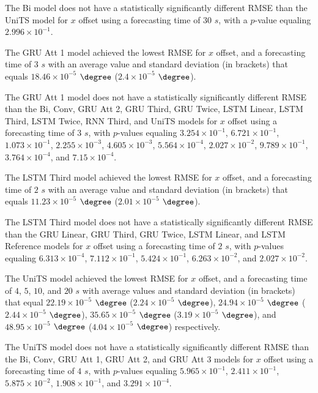 The Bi model does not have a statistically significantly different RMSE than the UniTS model for $x$ offset using a forecasting time of $30$ $s$, with a $p$-value equaling $2.996 \times 10^{-1}$.

The GRU Att 1 model achieved the lowest RMSE for $x$ offset, and a forecasting time of $3$ $s$ with an average value and standard deviation (in brackets) that equals $18.46 \times 10^{-5}$ $\degree$ ($2.4 \times 10^{-5}$ $\degree$).

The GRU Att 1 model does not have a statistically significantly different RMSE than the Bi, Conv, GRU Att 2, GRU Third, GRU Twice, LSTM Linear, LSTM Third, LSTM Twice, RNN Third, and UniTS models for $x$ offset using a forecasting time of $3$ $s$, with $p$-values equaling $3.254 \times 10^{-1}$, $6.721 \times 10^{-1}$, $1.073 \times 10^{-1}$, $2.255 \times 10^{-3}$, $4.605 \times 10^{-3}$, $5.564 \times 10^{-4}$, $2.027 \times 10^{-2}$, $9.789 \times 10^{-1}$, $3.764 \times 10^{-4}$, and $7.15 \times 10^{-4}$.

The LSTM Third model achieved the lowest RMSE for $x$ offset, and a forecasting time of $2$ $s$ with an average value and standard deviation (in brackets) that equals $11.23 \times 10^{-5}$ $\degree$ ($2.01 \times 10^{-5}$ $\degree$).

The LSTM Third model does not have a statistically significantly different RMSE than the GRU Linear, GRU Third, GRU Twice, LSTM Linear, and LSTM Reference models for $x$ offset using a forecasting time of $2$ $s$, with $p$-values equaling $6.313 \times 10^{-4}$, $7.112 \times 10^{-1}$, $5.424 \times 10^{-1}$, $6.263 \times 10^{-2}$, and $2.027 \times 10^{-2}$.

The UniTS model achieved the lowest RMSE for $x$ offset, and a forecasting time of $4$, $5$, $10$, and $20$ $s$ with average values and standard deviation (in brackets) that equal $22.19 \times 10^{-5}$ $\degree$ ($2.24 \times 10^{-5}$ $\degree$), $24.94 \times 10^{-5}$ $\degree$ ($2.44 \times 10^{-5}$ $\degree$), $35.65 \times 10^{-5}$ $\degree$ ($3.19 \times 10^{-5}$ $\degree$), and $48.95 \times 10^{-5}$ $\degree$ ($4.04 \times 10^{-5}$ $\degree$) respectively.

The UniTS model does not have a statistically significantly different RMSE than the Bi, Conv, GRU Att 1, GRU Att 2, and GRU Att 3 models for $x$ offset using a forecasting time of $4$ $s$, with $p$-values equaling $5.965 \times 10^{-1}$, $2.411 \times 10^{-1}$, $5.875 \times 10^{-2}$, $1.908 \times 10^{-1}$, and $3.291 \times 10^{-4}$.

